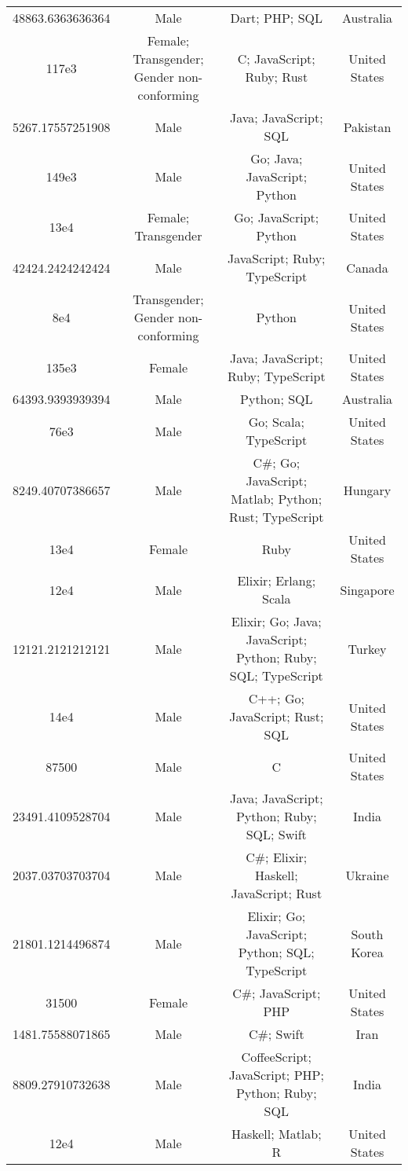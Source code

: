 \begin{center}
\begin{tabular}{ |c|c|c|c| }
48863.6363636364  &  Male  &  Dart; PHP; SQL  &  Australia  \\ 
117e3  &  Female; Transgender; Gender non-conforming  &  C; JavaScript; Ruby; Rust  &  United States  \\ 
5267.17557251908  &  Male  &  Java; JavaScript; SQL  &  Pakistan  \\ 
149e3  &  Male  &  Go; Java; JavaScript; Python  &  United States  \\ 
13e4  &  Female; Transgender  &  Go; JavaScript; Python  &  United States  \\ 
42424.2424242424  &  Male  &  JavaScript; Ruby; TypeScript  &  Canada  \\ 
8e4  &  Transgender; Gender non-conforming  &  Python  &  United States  \\ 
135e3  &  Female  &  Java; JavaScript; Ruby; TypeScript  &  United States  \\ 
64393.9393939394  &  Male  &  Python; SQL  &  Australia  \\ 
76e3  &  Male  &  Go; Scala; TypeScript  &  United States  \\ 
8249.40707386657  &  Male  &  C\#; Go; JavaScript; Matlab; Python; Rust; TypeScript  &  Hungary  \\ 
13e4  &  Female  &  Ruby  &  United States  \\ 
12e4  &  Male  &  Elixir; Erlang; Scala  &  Singapore  \\ 
12121.2121212121  &  Male  &  Elixir; Go; Java; JavaScript; Python; Ruby; SQL; TypeScript  &  Turkey  \\ 
14e4  &  Male  &  C++; Go; JavaScript; Rust; SQL  &  United States  \\ 
87500  &  Male  &  C  &  United States  \\ 
23491.4109528704  &  Male  &  Java; JavaScript; Python; Ruby; SQL; Swift  &  India  \\ 
2037.03703703704  &  Male  &  C\#; Elixir; Haskell; JavaScript; Rust  &  Ukraine  \\ 
21801.1214496874  &  Male  &  Elixir; Go; JavaScript; Python; SQL; TypeScript  &  South Korea  \\ 
31500  &  Female  &  C\#; JavaScript; PHP  &  United States  \\ 
1481.75588071865  &  Male  &  C\#; Swift  &  Iran  \\ 
8809.27910732638  &  Male  &  CoffeeScript; JavaScript; PHP; Python; Ruby; SQL  &  India  \\ 
12e4  &  Male  &  Haskell; Matlab; R  &  United States  \\ 

\end{tabular}
\end{center}
